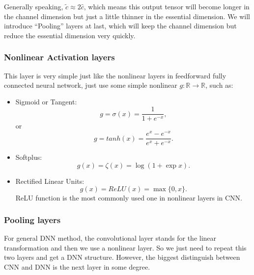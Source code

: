 Generally speaking, $\tilde c \approx 2\hat{c}$, which means this output tensor will become longer in the channel dimension but just a little thinner in the essential dimension. We will introduce ``Pooling'' layers at last, which will keep the channel dimension but reduce the essential dimension very quickly. 

\subsubsection{Nonlinear Activation layers}
This layer is very simple just like the nonlinear layers in feedforward fully connected neural network, just use some simple nonlinear $g: \mathbb{R} \to \mathbb{R}$, such as:
\begin{itemize}
\item Sigmoid or Tangent:
\begin{equation}
g = \sigma (x) = \frac{1}{1 + e^{-x}},
\end{equation}
or 
\begin{equation}
g = tanh(x) = \frac{e^x - e^{-x}}{e^x + e^{-x}}.
\end{equation}

\item Softplus:
\begin{equation}
g(x) = \zeta(x) = \log(1 + \exp{x}).
\end{equation}

\item Rectified Linear Units:
\begin{equation}
g(x) = ReLU(x) = \max\{0,x\}.
\end{equation}
ReLU function is the most commonly used one in nonlinear layers in CNN. 
\end{itemize}



\subsubsection{Pooling layers}
For general DNN method, the convolutional layer stands for the linear transformation and then we use a nonlinear layer.  So we just need to repeat this two layers and get a DNN structure.  However, the biggest distinguish between CNN and DNN is the next layer in some degree. 


